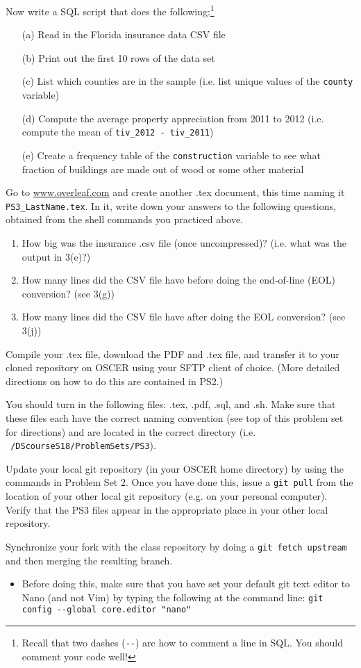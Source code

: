 \documentclass[12pt,english]{exam}
\begin{document}
\begin{questions}
\question Now write a SQL script that does the following:\footnote{Recall that two dashes (\texttt{-{}-}) are how to comment a line in SQL. You should comment your code well!}
\begin{itemize}
	\item[(a)] Read in the Florida insurance data CSV file
	\item[(b)] Print out the first 10 rows of the data set
	\item[(c)] List which counties are in the sample (i.e. list unique values of the \texttt{county} variable)
	\item[(d)] Compute the average property appreciation from 2011 to 2012 (i.e. compute the mean of \texttt{tiv\_2012 - tiv\_2011})
	\item[(e)] Create a frequency table of the \texttt{construction} variable to see what fraction of buildings are made out of wood or some other material
\end{itemize}

\question Go to \url{www.overleaf.com} and create another .tex document, this time naming it \texttt{PS3\_LastName.tex}. In it, write down your answers to the following questions, obtained from the shell commands you practiced above.
\begin{enumerate}
	\item How big was the insurance .csv file (once uncompressed)? (i.e. what was the output in 3(e)?)
	\item How many lines did the CSV file have before doing the end-of-line (EOL) conversion? (see 3(g))
	\item How many lines did the CSV file have after doing the EOL conversion? (see 3(j))
\end{enumerate}

\question Compile your .tex file, download the PDF and .tex file, and transfer it to your cloned repository on OSCER using your SFTP client of choice. (More detailed directions on how to do this are contained in PS2.)

\question You should turn in the following files: .tex, .pdf, .sql, and .sh. Make sure that these files each have the correct naming convention (see top of this problem set for directions) and are located in the correct directory (i.e. \texttt{~/DScourseS18/ProblemSets/PS3}).

\question Update your local git repository (in your OSCER home directory) by using the commands in Problem Set 2. Once you have done this, issue a \texttt{git pull} from the location of your other local git repository (e.g. on your personal computer). Verify that the PS3 files appear in the appropriate place in your other local repository.

\question Synchronize your fork with the class repository by doing a \texttt{git fetch upstream} and then merging the resulting branch. 
\begin{itemize}
	\item Before doing this, make sure that you have set your default git text editor to Nano (and not Vim) by typing the following at the command line: \texttt{git config -{}-global core.editor "nano"}
\end{itemize}

\end{questions}
\end{document}
